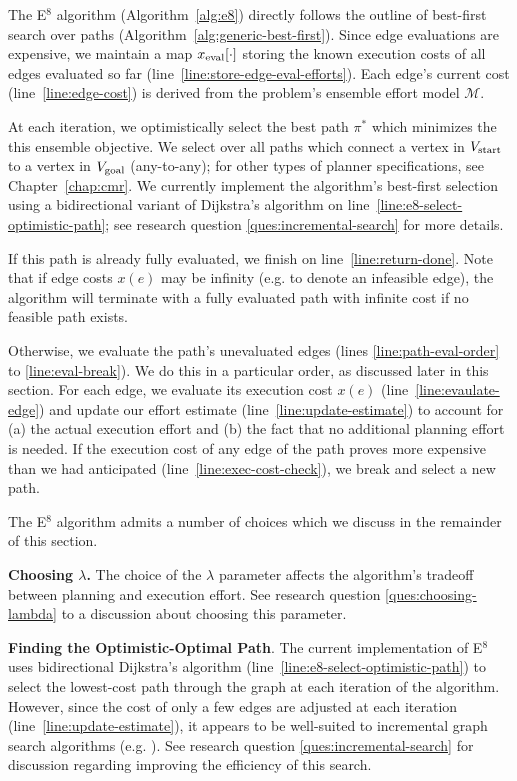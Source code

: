 The E$^8$ algorithm (Algorithm~\ref{alg:e8})
directly follows the outline
of best-first search over paths
(Algorithm~\ref{alg:generic-best-first}).
Since edge evaluations are expensive,
we maintain a map $x_{\mbox{\scriptsize eval}}[\cdot]$
storing the known execution costs of all edges evaluated so far
(line~\ref{line:store-edge-eval-efforts}).
Each edge's current cost (line~\ref{line:edge-cost})
is derived from the problem's ensemble effort model $\mathcal{M}$.

At each iteration,
we optimistically select the best path $\pi^*$
which minimizes the this ensemble objective.
We select over all paths which connect
a vertex in $V_{\mbox{\scriptsize start}}$
to a vertex in $V_{\mbox{\scriptsize goal}}$
(any-to-any);
for other types of planner specifications,
see Chapter~\ref{chap:cmr}.
We currently implement the algorithm's best-first selection
using a bidirectional variant of
Dijkstra's algorithm \cite{dijkstra1959anote}
on line~\ref{line:e8-select-optimistic-path};
see research question \ref{ques:incremental-search}
for more details.

If this path is already fully evaluated,
we finish on line~\ref{line:return-done}.
Note that if edge costs $x(e)$ may be infinity
(e.g. to denote an infeasible edge),
the algorithm will terminate with a fully evaluated path
with infinite cost if no feasible path exists.

Otherwise,
we evaluate the path's unevaluated edges
(lines \ref{line:path-eval-order}
to \ref{line:eval-break}).
We do this in a particular order,
as discussed later in this section.
For each edge,
we evaluate its execution cost $x(e)$ (line~\ref{line:evaulate-edge})
and update our effort estimate (line~\ref{line:update-estimate})
to account for (a) the actual execution effort
and (b) the fact that no additional planning effort is needed.
If the execution cost of any edge of the path proves
more expensive than we had anticipated
(line~\ref{line:exec-cost-check}),
we break and select a new path.

The E$^8$ algorithm admits a number of choices
which we discuss in the remainder of this section.

\textbf{Choosing $\lambda$.}
The choice of the $\lambda$ parameter
affects the algorithm's tradeoff between planning and execution effort.
See research question \ref{ques:choosing-lambda}
to a discussion about choosing this parameter.

\textbf{Finding the Optimistic-Optimal Path}.
The current implementation of E$^8$ uses
bidirectional Dijkstra's algorithm
(line~\ref{line:e8-select-optimistic-path})
to select the lowest-cost path through the graph
at each iteration of the algorithm.
However, since the cost of only a few edges
are adjusted at each iteration (line~\ref{line:update-estimate}),
it appears to be well-suited to incremental
graph search algorithms (e.g. \cite{koenig2004lpastar}).
See research question \ref{ques:incremental-search}
for discussion regarding improving the efficiency of this search.

